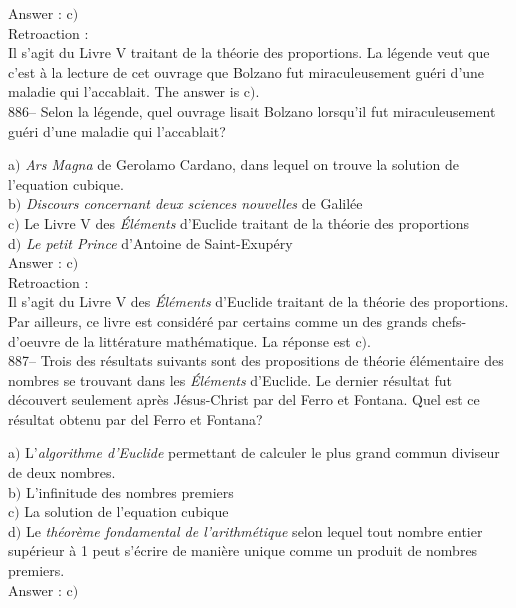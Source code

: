 ﻿\documentclass[letterpaper, 12pt]{article}
\begin{document}
Answer : c$)$\\

Retroaction :\\
Il s'agit du Livre V traitant de la th\'eorie des proportions.
La l\'egende veut que c'est \`a la lecture de cet ouvrage que Bolzano fut
miraculeusement gu\'eri d'une maladie qui l'accablait. The answer is
c$)$.\\

886-- Selon la l\'egende, quel ouvrage lisait Bolzano lorsqu'il fut
miraculeusement gu\'eri d'une maladie qui l'accablait?

a$)$ {\sl Ars Magna} de Gerolamo Cardano, dans lequel on trouve la solution
de l'equation cubique. \\
b$)$ {\sl Discours concernant deux sciences nouvelles} de Galil\'ee  \\
c$)$ Le Livre V des {\sl \'El\'ements} d'Euclide traitant de la th\'eorie
des proportions \\
d$)$ {\sl Le petit Prince} d'Antoine de Saint-Exup\'ery  \\

Answer : c$)$\\

Retroaction :\\
Il s'agit du Livre V des {\sl \'El\'ements} d'Euclide traitant de la
th\'eorie des proportions.
Par ailleurs, ce livre est consid\'er\'e par certains comme un
des grands chefs-d'oeuvre de la litt\'erature math\'ematique. La r\'eponse
est c$)$.\\

887-- Trois des r\'esultats suivants sont des propositions de
th\'eorie \'el\'ementaire des nombres se trouvant dans les {\sl
\'El\'ements} d'Euclide. Le dernier r\'esultat fut d\'ecouvert
seulement apr\`es J\'esus-Christ par del Ferro et Fontana. Quel est
ce r\'esultat obtenu par del Ferro et Fontana?

a$)$ L'{\sl algorithme d'Euclide} permettant de calculer le plus grand
commun diviseur de deux nombres. \\
b$)$ L'infinitude des nombres premiers  \\
c$)$ La solution de l'equation cubique \\
d$)$ Le {\sl th\'eor\`eme fondamental de l'arithm\'etique} selon lequel tout
nombre entier sup\'erieur \`a 1 peut
s'\'ecrire de mani\`ere unique comme un produit de nombres premiers.\\

Answer : c$)$\\
\end{document}
